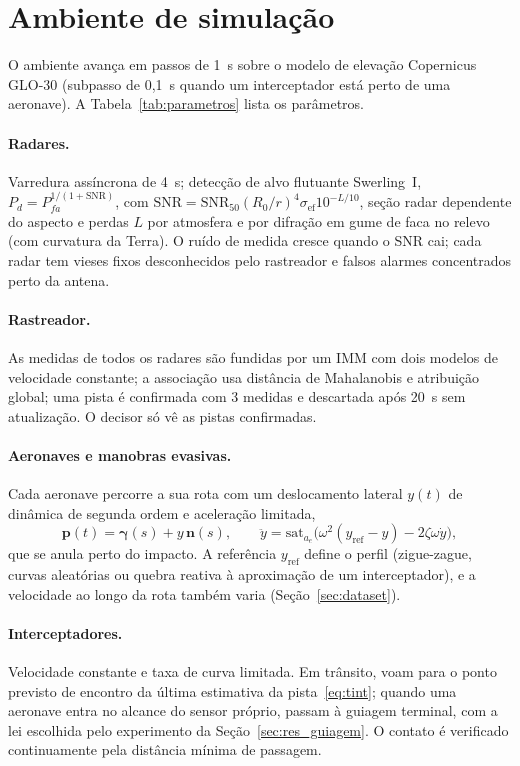 \documentclass[11pt,a4paper]{article}
\begin{document}
\section{Ambiente de simulação}\label{sec:ambiente}

O ambiente avança em passos de 1~s sobre o modelo de elevação Copernicus GLO-30 (subpasso de 0{,}1~s quando um
interceptador está perto de uma aeronave). A Tabela~\ref{tab:parametros} lista os parâmetros.

\paragraph{Radares.} Varredura assíncrona de 4~s; detecção de alvo flutuante Swerling~I, $P_d=P_{fa}^{1/(1+\mathrm{SNR})}$,
com $\mathrm{SNR}=\mathrm{SNR}_{50}(R_0/r)^4\sigma_{\mathrm{ef}}10^{-L/10}$, seção radar dependente do aspecto e perdas $L$
por atmosfera e por difração em gume de faca no relevo (com curvatura da Terra). O ruído de medida cresce quando o SNR cai;
cada radar tem vieses fixos desconhecidos pelo rastreador e falsos alarmes concentrados perto da antena.

\paragraph{Rastreador.} As medidas de todos os radares são fundidas por um IMM com dois modelos de velocidade constante;
a associação usa distância de Mahalanobis e atribuição global; uma pista é confirmada com 3 medidas e descartada após 20~s
sem atualização. O decisor só vê as pistas confirmadas.

\paragraph{Aeronaves e manobras evasivas.} Cada aeronave percorre a sua rota com um deslocamento lateral $y(t)$ de dinâmica
de segunda ordem e aceleração limitada,
\begin{equation}
  \bm{p}(t)=\bm{\gamma}(s)+y\,\bm{n}(s),\qquad
  \ddot y = \mathrm{sat}_{a_e}\!\big(\omega^2(y_{\mathrm{ref}}-y)-2\zeta\omega\dot y\big),
  \label{eq:evasao}
\end{equation}
que se anula perto do impacto. A referência $y_{\mathrm{ref}}$ define o perfil (zigue-zague, curvas aleatórias ou quebra
reativa à aproximação de um interceptador), e a velocidade ao longo da rota também varia (Seção~\ref{sec:dataset}).

\paragraph{Interceptadores.} Velocidade constante e taxa de curva limitada. Em trânsito, voam para o ponto previsto de
encontro da última estimativa da pista~\eqref{eq:tint}; quando uma aeronave entra no alcance do sensor próprio, passam à
guiagem terminal, com a lei escolhida pelo experimento da Seção~\ref{sec:res_guiagem}. O contato é verificado
continuamente pela distância mínima de passagem.
\end{document}
